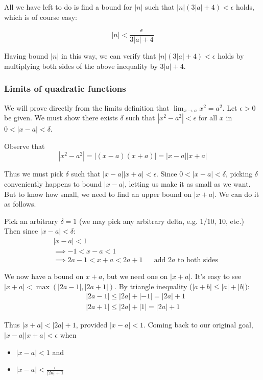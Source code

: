 \vs

All we have left to do is find a bound for $|n|$ such that
$|n|(3|a|+4)<\epsilon$ holds, which is of course easy:

\[|n|<\frac{\epsilon}{3|a|+4}\]

Having bound $|n|$ in this way, we can verify that
$|n|(3|a|+4)<\epsilon$ holds by multiplying both sides of the above
inequality by $3|a|+4$.

\subsubsection*{Limits of quadratic functions}

We will prove directly from the limits definition that
$\lim_{x\to a}x^2=a^2$. Let $\epsilon>0$ be given. We must show there exists
$\delta$ such that $|x^2-a^2|<\epsilon$ for all $x$ in $0<|x-a|<\delta$.

\vs

Observe that
\[|x^2-a^2|=|(x-a)(x+a)|=|x-a||x+a|\]

Thus we must pick $\delta$ such that $|x-a||x+a|<\epsilon$. Since
$0<|x-a|<\delta$, picking $\delta$ conveniently happens to bound
$|x-a|$, letting us make it as small as we want. But to know how
small, we need to find an upper bound on $|x+a|$. We can do it as
follows.

\vs

Pick an arbitrary $\delta=1$ (we may pick any arbitrary delta, e.g. $1/10$,
$10$, etc.) Then since $|x-a|<\delta$:
\begin{align*}
    &|x-a|<1\\
    &\implies -1<x-a<1\\
    &\implies 2a-1<x+a<2a+1&&\text{add $2a$ to both sides}
\end{align*}

We now have a bound on $x+a$, but we need one on $|x+a|$. It's easy to
see $|x+a|<\max(|2a-1|, |2a+1|)$. By triangle inequality
($|a+b|\leq|a|+|b|$):
\begin{align*}
    &|2a-1|\leq|2a|+|-1|=|2a|+1\\
    &|2a+1|\leq|2a|+|1|=|2a|+1
\end{align*}

Thus $|x+a|<|2a|+1$, provided $|x-a|<1$. Coming back to our original
goal, $|x-a||x+a|<\epsilon$ when

\begin{itemize}
    \item $|x-a|<1$ and
    \item $|x-a|<\frac{\epsilon}{|2a|+1}$
\end{itemize}

